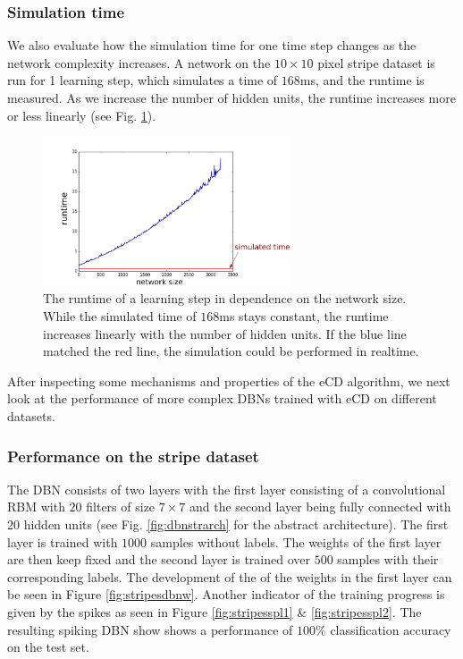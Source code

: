\subsubsection{Simulation time} \label{c:simtimeexp}

We also evaluate how the simulation time for one time step changes as the network complexity increases.
A network on the $10 \times 10$ pixel stripe dataset is run for 1 learning step, which simulates a time of $168$ms, and the runtime is measured.
As we increase the number of hidden units, the runtime increases more or less linearly (see Fig. \ref{fig:simtime}).

\begin{figure}[h!]
	\centering
    	\includegraphics[width=0.65\textwidth]{imgs/runtime-1.png} 
    \caption[The runtime of a learning step in dependence on the network size.]{The runtime of a learning step in dependence on the network size. While the simulated time of $168$ms stays constant, the runtime increases linearly with the number of hidden units. If the blue line matched the red line, the simulation could be performed in realtime.}
	\label{fig:simtime}
\end{figure}

After inspecting some mechanisms and properties of the eCD algorithm, we next look at the performance of more complex DBNs trained with eCD on different datasets.

\subsubsection{Performance on the stripe dataset} \label{c:stripeexp}

The DBN consists of two layers with the first layer consisting of a convolutional RBM with $20$ filters of size $7 \times 7$ and the second layer being fully connected with $20$ hidden units (see Fig. \ref{fig:dbnstrarch} for the abstract architecture).
The first layer is trained with $1000$ samples without labels.
The weights of the first layer are then keep fixed and the second layer is trained over $500$ samples with their corresponding labels.
The development of the of the weights in the first layer can be seen in Figure \ref{fig:stripesdbnw}.
Another indicator of the training progress is given by the spikes as seen in Figure \ref{fig:stripesspl1} \& \ref{fig:stripesspl2}.
The resulting spiking DBN show shows a performance of $100 \%$ classification accuracy on the test set. 

